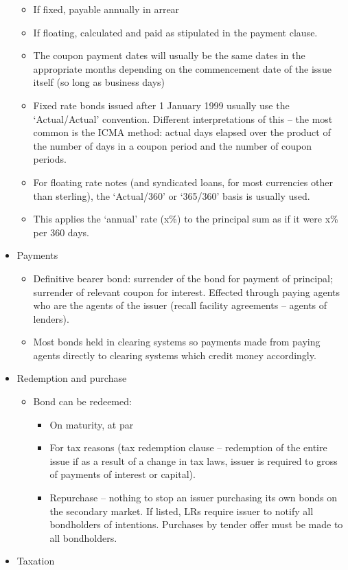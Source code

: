 \documentclass[
]{article}
\providecommand{\tightlist}{%
  \setlength{\itemsep}{0pt}\setlength{\parskip}{0pt}}
\begin{document}
\begin{itemize}
  \begin{itemize}
  \tightlist
  \item
    If fixed, payable annually in arrear
  \item
    If floating, calculated and paid as stipulated in the payment
    clause.
  \item
    The coupon payment dates will usually be the same dates in the
    appropriate months depending on the commencement date of the issue
    itself (so long as business days)
  \item
    Fixed rate bonds issued after 1 January 1999 usually use the
    `Actual/Actual' convention. Different interpretations of this -- the
    most common is the ICMA method: actual days elapsed over the product
    of the number of days in a coupon period and the number of coupon
    periods.
  \item
    For floating rate notes (and syndicated loans, for most currencies
    other than sterling), the `Actual/360' or `365/360' basis is usually
    used.
  \item
    This applies the `annual' rate (x\%) to the principal sum as if it
    were x\% per 360 days.
  \end{itemize}
\item
  Payments

  \begin{itemize}
  \tightlist
  \item
    Definitive bearer bond: surrender of the bond for payment of
    principal; surrender of relevant coupon for interest. Effected
    through paying agents who are the agents of the issuer (recall
    facility agreements -- agents of lenders).
  \item
    Most bonds held in clearing systems so payments made from paying
    agents directly to clearing systems which credit money accordingly.
  \end{itemize}
\item
  Redemption and purchase

  \begin{itemize}
  \tightlist
  \item
    Bond can be redeemed:

    \begin{itemize}
    \tightlist
    \item
      On maturity, at par
    \item
      For tax reasons (tax redemption clause -- redemption of the entire
      issue if as a result of a change in tax laws, issuer is required
      to gross of payments of interest or capital).
    \item
      Repurchase -- nothing to stop an issuer purchasing its own bonds
      on the secondary market. If listed, LRs require issuer to notify
      all bondholders of intentions. Purchases by tender offer must be
      made to all bondholders.
    \end{itemize}
  \end{itemize}
\item
  Taxation


\end{itemize}
\end{document}
